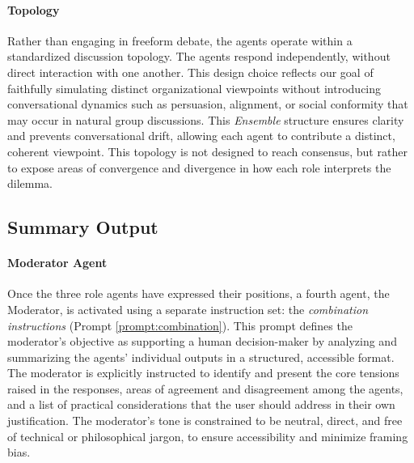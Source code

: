\paragraph{Topology}{
  Rather than engaging in freeform debate, the agents operate within a standardized discussion topology. The agents respond independently, without direct interaction with one another. This design choice reflects our goal of faithfully simulating distinct organizational viewpoints without introducing conversational dynamics such as persuasion, alignment, or social conformity that may occur in natural group discussions. This \textit{Ensemble} structure ensures clarity and prevents conversational drift, allowing each agent to contribute a distinct, coherent viewpoint. This topology is not designed to reach consensus, but rather to expose areas of convergence and divergence in how each role interprets the dilemma.
}

\subsection{Summary Output}
\label{sec:summary}

\paragraph{Moderator Agent}{
  Once the three role agents have expressed their positions, a fourth agent, the Moderator, is activated using a separate instruction set: the \textit{combination instructions} (Prompt \ref{prompt:combination}). This prompt defines the moderator's objective as supporting a human decision-maker by analyzing and summarizing the agents' individual outputs in a structured, accessible format. The moderator is explicitly instructed to identify and present the core tensions raised in the responses, areas of agreement and disagreement among the agents, and a list of practical considerations that the user should address in their own justification. The moderator's tone is constrained to be neutral, direct, and free of technical or philosophical jargon, to ensure accessibility and minimize framing bias.
}


